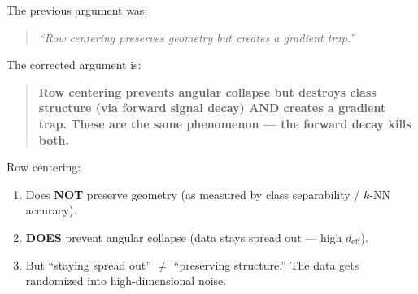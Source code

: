 The previous argument was:
\begin{quote}
\emph{``Row centering preserves geometry but creates a gradient trap.''}
\end{quote}

The corrected argument is:
\begin{quote}
\textbf{Row centering prevents angular collapse but destroys class
structure (via forward signal decay) AND creates a gradient trap.
These are the same phenomenon --- the forward decay kills both.}
\end{quote}

Row centering:
\begin{enumerate}
  \item Does \textbf{NOT} preserve geometry (as measured by class
        separability / $k$-NN accuracy).
  \item \textbf{DOES} prevent angular collapse (data stays spread out
        --- high $d_{\mathrm{eff}}$).
  \item But ``staying spread out'' $\neq$ ``preserving structure.''
        The data gets randomized into high-dimensional noise.
\end{enumerate}
